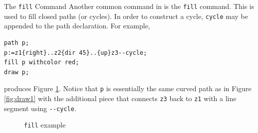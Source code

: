 \begin{subsection}{The \texttt{fill} Command}
Another common command in \MP{} is the \texttt{fill} command.  This is used to fill closed paths (or cycles).  In order to construct a cycle, \texttt{cycle} may be appended to the path declaration.  For example,
\begin{lstlisting}[xleftmargin=7bp]
path p;
p:=z1{right}..z2{dir 45}..{up}z3--cycle;
fill p withcolor red;
draw p;
\end{lstlisting}
produces Figure \ref{fig:fill}.  Notice that \texttt{p} is essentially the same curved path as in Figure \ref{fig:draw1} with the additional piece that connects \texttt{z3} back to \texttt{z1} with a line segment using \texttt{-{}-cycle}.
\begin{figure}[hptb]
	\begin{center}\end{center}
	\caption{\texttt{fill} example}\label{fig:fill}
\end{figure}


\end{subsection}
